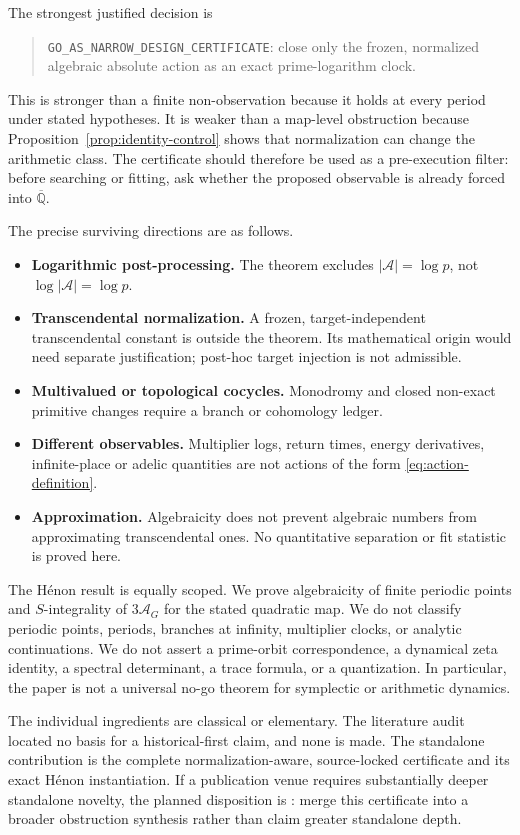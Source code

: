 \documentclass[11pt]{article}
\theoremstyle{definition}
\theoremstyle{remark}
\newcommand{\Qbar}{\overline{\mathbb Q}}
\newcommand{\Action}{\mathcal A}
\begin{document}
The strongest justified decision is
\begin{quote}
\centering
\texttt{GO\_AS\_NARROW\_DESIGN\_CERTIFICATE}: close only the frozen,
normalized algebraic absolute action as an exact prime-logarithm clock.
\end{quote}
This is stronger than a finite non-observation because it holds at every
period under stated hypotheses.  It is weaker than a map-level obstruction
because Proposition~\ref{prop:identity-control} shows that normalization can
change the arithmetic class.  The certificate should therefore be used as a
pre-execution filter: before searching or fitting, ask whether the proposed
observable is already forced into $\Qbar$.

The precise surviving directions are as follows.
\begin{itemize}
  \item \textbf{Logarithmic post-processing.}  The theorem excludes
  $|\Action|=\log p$, not $\log|\Action|=\log p$.
  \item \textbf{Transcendental normalization.}  A frozen, target-independent
  transcendental constant is outside the theorem.  Its mathematical origin
  would need separate justification; post-hoc target injection is not
  admissible.
  \item \textbf{Multivalued or topological cocycles.}  Monodromy and closed
  non-exact primitive changes require a branch or cohomology ledger.
  \item \textbf{Different observables.}  Multiplier logs, return times,
  energy derivatives, infinite-place or adelic quantities are not actions of
  the form \eqref{eq:action-definition}.
  \item \textbf{Approximation.}  Algebraicity does not prevent algebraic
  numbers from approximating transcendental ones.  No quantitative separation
  or fit statistic is proved here.
\end{itemize}

The H\'enon result is equally scoped.  We prove algebraicity of finite
periodic points and $S$-integrality of $3\Action_G$ for the stated quadratic
map.  We do not classify periodic points, periods, branches at infinity,
multiplier clocks, or analytic continuations.  We do not assert a prime-orbit
correspondence, a dynamical zeta identity, a spectral determinant, a trace
formula, or a quantization.  In particular, the paper is not a universal
no-go theorem for symplectic or arithmetic dynamics.

The individual ingredients are classical or elementary.  The literature
audit located no basis for a historical-first claim, and none is made.  The
standalone contribution is the complete normalization-aware, source-locked
certificate and its exact H\'enon instantiation.  If a publication venue
requires substantially deeper standalone novelty, the planned disposition is
: merge this certificate into a
broader obstruction synthesis rather than claim greater standalone depth.
\end{document}
